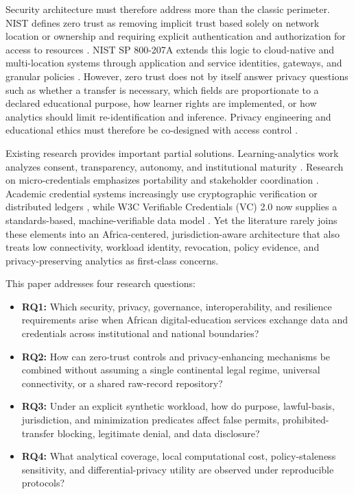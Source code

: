 \documentclass[journal]{IEEEtran}
\begin{document}
Security architecture must therefore address more than the classic perimeter. NIST defines zero trust as removing implicit trust based solely on network location or ownership and requiring explicit authentication and authorization for access to resources \cite{nist800207}. NIST SP 800-207A extends this logic to cloud-native and multi-location systems through application and service identities, gateways, and granular policies \cite{nist800207a}. However, zero trust does not by itself answer privacy questions such as whether a transfer is necessary, which fields are proportionate to a declared educational purpose, how learner rights are implemented, or how analytics should limit re-identification and inference. Privacy engineering and educational ethics must therefore be co-designed with access control \cite{nistprivacy,nist8062,hoelchen2018,jones2019}.

Existing research provides important partial solutions. Learning-analytics work analyzes consent, transparency, autonomy, and institutional maturity \cite{ifenthaler2016,hoelgriffiths2017,hoelchen2019,simic2025}. Research on micro-credentials emphasizes portability and stakeholder coordination \cite{ahsan2023,varadarajan2023}. Academic credential systems increasingly use cryptographic verification or distributed ledgers \cite{rustemi2024,wang2025}, while W3C Verifiable Credentials (VC) 2.0 now supplies a standards-based, machine-verifiable data model \cite{w3cvc20}. Yet the literature rarely joins these elements into an Africa-centered, jurisdiction-aware architecture that also treats low connectivity, workload identity, revocation, policy evidence, and privacy-preserving analytics as first-class concerns.

This paper addresses four research questions:
\begin{itemize}
  \item \textbf{RQ1:} Which security, privacy, governance, interoperability, and resilience requirements arise when African digital-education services exchange data and credentials across institutional and national boundaries?
  \item \textbf{RQ2:} How can zero-trust controls and privacy-enhancing mechanisms be combined without assuming a single continental legal regime, universal connectivity, or a shared raw-record repository?
  \item \textbf{RQ3:} Under an explicit synthetic workload, how do purpose, lawful-basis, jurisdiction, and minimization predicates affect false permits, prohibited-transfer blocking, legitimate denial, and data disclosure?
  \item \textbf{RQ4:} What analytical coverage, local computational cost, policy-staleness sensitivity, and differential-privacy utility are observed under reproducible protocols?
\end{itemize}
\end{document}
